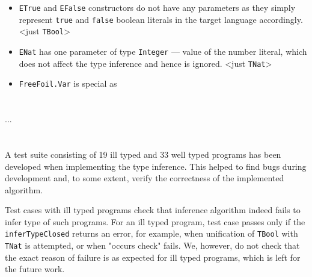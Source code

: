 \begin{itemize}
  \item \texttt{ETrue} and \texttt{EFalse} constructors do not have any parameters as they simply represent \texttt{true} and \texttt{false} boolean literals in the target language accordingly. \textless just \texttt{TBool}\textgreater
  \item \texttt{ENat} has one parameter of type \texttt{Integer} — value of the number literal, which does not affect the type inference and hence is ignored. \textless just \texttt{TNat}\textgreater
  \item \texttt{FreeFoil.Var} is special as
\end{itemize}


\section{}

...


\section{}

A test suite consisting of 19 ill typed and 33 well typed programs has been developed when implementing the type inference. This helped to find bugs during development and, to some extent, verify the correctness of the implemented algorithm.

Test cases with ill typed programs check that inference algorithm indeed fails to infer type of such programs. For an ill typed program, test case passes only if the \texttt{inferTypeClosed} returns an error, for example, when unification of \texttt{TBool} with \texttt{TNat} is attempted, or when "occurs check" fails. We, however, do not check that the exact reason of failure is as expected for ill typed programs, which is left for the future work.

